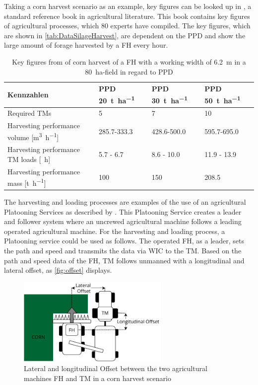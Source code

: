 Taking a corn harvest scenario as an example, key figures can be looked up in \cite{faustzahlen2018}, a standard reference book in agricultural literature. This book contains key figures of agricultural processes, which 80 experts have compiled. The key figures, which are shown in \autoref{tab:DataSilageHarvest}, are dependent on the \ac{PPD} and show the large amount of forage harvested by  a  \ac{FH} every hour.
\begin{table}
	\centering
	\begin{tabular}{>{\raggedright}p{5.5cm}p{1.6cm}p{1.6cm}p{1.6cm}}
		\toprule
		Kennzahlen & \ac{PPD} \SI{20}{\tonne\per\hectare} & \ac{PPD} \SI{30}{\tonne\per\hectare} & \ac{PPD} \SI{50}{\tonne\per\hectare}\\
		\midrule
		Required \ac{TM}s & \num{5}&
		\num{7} & \num{10} \\
		Harvesting performance volume [\si{\cubic\metre\per\hour}] &
		\num{285.7}-\num{333.3}
		& \num{428.6}-\num{500.0} &
		\num{595.7}-\num{695.0}\\
		Harvesting performance \ac{TM} loads [\si{\per\hour}] &
		\num{5.7} - \num{6.7}
		& \num{8.6} - \num{10.0} &
		\num{11.9} - \num{13.9}\\
		Harvesting performance mass [\si{\tonne\per\hour}] & \num{100}
		& \num{150} &
		\num{208.5} \\
		\bottomrule
	\end{tabular}
	\caption{Key figures from \cite{faustzahlen2018} of corn harvest of a \ac{FH} with a working width of \SI{6.2}{\metre} in a \SI{80}{\hectare}-field in regard to \ac{PPD}}
	\label{tab:DataSilageHarvest}
\end{table}

The harvesting and loading processes are examples of the use of an agricultural Platooning Services as described by 
\textcite{zhang_method_2009}.
This Platooning Service creates a leader and follower system where an uncrewed agricultural machine follows a leading operated agricultural machine.
For the harvesting and loading process, a Platooning service could be used as follows.
The operated \ac{FH}, as a leader, sets the path and speed and transmits the data via \ac{WIC} to the \ac{TM}. Based on the path and speed data of the \ac{FH}, \ac{TM} follows unmanned with a longitudinal and lateral offset, as \autoref{fig:offset} displays.
\begin{figure}%
	\centering
	\includegraphics[width=0.65\textwidth]{figures/offset_platoon.pdf}
	\caption{Lateral and longitudinal Offset between the two agricultural machines \ac{FH} and \ac{TM} in a corn harvest scenario}%
	\label{fig:offset}%
\end{figure}

